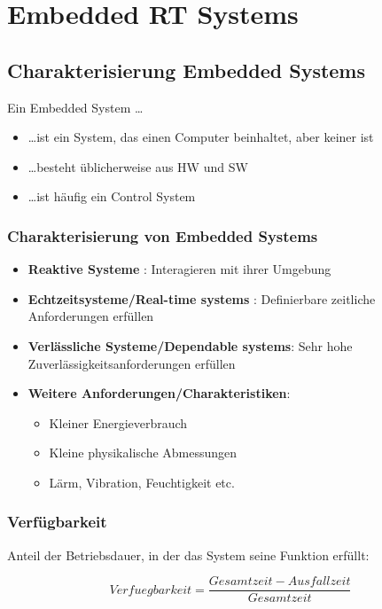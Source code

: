 \section{Embedded RT Systems}
\subsection{Charakterisierung Embedded Systems}
Ein Embedded System \ldots
\begin{itemize}
  \item \ldots ist ein System, das einen Computer beinhaltet, aber keiner ist
  \item \ldots besteht üblicherweise aus HW und SW
  \item \ldots ist häufig ein Control System
\end{itemize}
\subsubsection{Charakterisierung von Embedded Systems}
  \begin{itemize}
    \item \textbf{Reaktive Systeme} : Interagieren mit ihrer Umgebung
    \item \textbf{Echtzeitsysteme/Real-time systems} : Definierbare zeitliche
    Anforderungen erfüllen
    \item \textbf{Verlässliche Systeme/Dependable systems}: Sehr hohe
    Zuverlässigkeitsanforderungen erfüllen
    \item \textbf{Weitere Anforderungen/Charakteristiken}: 
    \begin{itemize}
      \item Kleiner Energieverbrauch
      \item Kleine physikalische Abmessungen
      \item Lärm, Vibration, Feuchtigkeit etc.
    \end{itemize}
  \end{itemize}

\subsubsection{Verfügbarkeit}
Anteil der Betriebsdauer, in  der das System seine Funktion
erfüllt: 

\begin{equation}
Verfuegbarkeit = \frac{Gesamtzeit-Ausfallzeit}{Gesamtzeit}
\end{equation}

